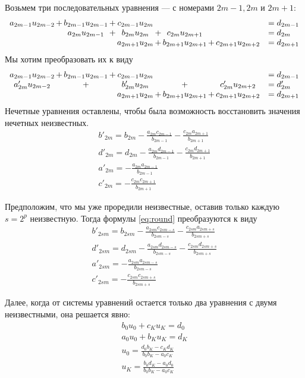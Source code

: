 \documentclass[12pt]{article}
\begin{document}
Возьмем три последовательных уравнения --- с номерами $2m-1, 2m$ и $2m+1$:
\[
\begin{array}{c@{\,}c@{\,}c@{\,}c@{\,}c@{\,}c@{\,}c@{\,}c@{\,}cl}
a_{2m-1} u_{2m-2} &+& b_{2m-1} u_{2m-1} &+& c_{2m-1} u_{2m} &&&&& = d_{2m-1}\\
&&a_{2m} u_{2m-1} &+& b_{2m} u_{2m} &+& c_{2m} u_{2m+1} &&& = d_{2m}\\
&&&&a_{2m+1} u_{2m} &+& b_{2m+1} u_{2m+1} &+& c_{2m+1} u_{2m+2} & = d_{2m+1}
\end{array}
\]
Мы хотим преобразовать их к виду
\[
\begin{array}{c@{\,}c@{\,}c@{\,}c@{\,}c@{\,}c@{\,}c@{\,}c@{\,}cl}
a_{2m-1} u_{2m-2} &+& b_{2m-1} u_{2m-1} &+& c_{2m-1} u_{2m} &&&&& = d_{2m-1}\\
a'_{2m} u_{2m-2} &&+&& b'_{2m} u_{2m} &&+&& c'_{2m} u_{2m+2} & = d'_{2m}\\
&&&&a_{2m+1} u_{2m} &+& b_{2m+1} u_{2m+1} &+& c_{2m+1} u_{2m+2} & = d_{2m+1}
\end{array}
\]
Нечетные уравнения оставлены, чтобы была возможность восстановить значения
нечетных неизвестных. 
\begin{gather}
\nonumber
b'_{2m} = b_{2m} - \frac{a_{2m}c_{2m-1}}{b_{2m-1}} -
\frac{c_{2m}a_{2m+1}}{b_{2m+1}}\\\label{eq:round}
d'_{2m} = d_{2m} - \frac{a_{2m}d_{2m-1}}{b_{2m-1}} -
\frac{c_{2m}d_{2m+1}}{b_{2m+1}}\\\nonumber
a'_{2m} = -\frac{a_{2m}a_{2m-1}}{b_{2m-1}}\\\nonumber
c'_{2m} = -\frac{c_{2m}c_{2m+1}}{b_{2m+1}}
\end{gather}

Предположим, что мы уже проредили неизвестные, оставив только каждую $s=2^p$
неизвестную. Тогда формулы \eqref{eq:round} преобразуются к виду
\begin{gather}
\nonumber
b'_{2sm} = b_{2sm} - \frac{a_{2sm}c_{2sm-s}}{b_{2sm-s}} -
\frac{c_{2sm}a_{2sm+s}}{b_{2sm+s}}\\\label{eq:rounds}
d'_{2sm} = d_{2sm} - \frac{a_{2sm}d_{2sm-s}}{b_{2sm-s}} -
\frac{c_{2sm}d_{2sm+s}}{b_{2sm+s}}\\\nonumber
a'_{2sm} = -\frac{a_{2sm}a_{2sm-s}}{b_{2sm-s}}\\\nonumber
c'_{2sm} = -\frac{c_{2sm}c_{2sm+s}}{b_{2sm+s}}
\end{gather}

Далее, когда от системы уравнений остается только два уравнения с двумя
неизвестными, она решается явно:
\begin{gather*}
b_0 u_0 + c_K u_K = d_0\\
a_0 u_0 + b_K u_K = d_K\\
u_0 = \frac{d_0 b_K - c_K d_K}{b_0 b_K - a_0 c_K}\\
u_K = \frac{b_0 d_K - a_0 d_0}{b_0 b_K - a_0 c_K}
\end{gather*}
\end{document}
